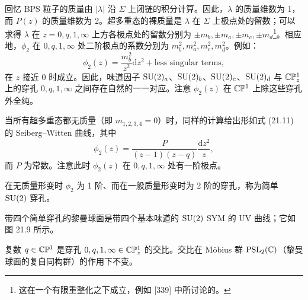 回忆 BPS 粒子的质量由 $|\lambda|$ 沿 $\Sigma$ 上闭链的积分计算。因此，$\lambda$ 的质量维数为 1，而 $P(z)$ 的质量维数为 2。超多重态的裸质量是 $\lambda$ 在 $\Sigma$ 上极点处的留数；可以求得 $\lambda$ 在 $z=0,q,1,\infty$ 上方各极点处的留数分别为 $\pm m_b,\pm m_a,\pm m_c,\pm m_d$\footnote{这在一个有限重整化之下成立，例如 [339] 中所讨论的。}。相应地，$\phi_2$ 在 $0,q,1,\infty$ 处二阶极点的系数分别为 $m_b^2,m_a^2,m_c^2,m_d^2$。例如：
\begin{equation}
\phi_2(z)=\frac{m_b^2}{z^2}\mathrm{d}z^2+\text{less singular terms},
\tag{21.12}
\end{equation}
在 $z$ 接近 0 时成立。因此，味道因子 $\operatorname{SU}(2)_a$、$\operatorname{SU}(2)_b$、$\operatorname{SU}(2)_c$、$\operatorname{SU}(2)_d$ 与 $\mathbb{C}\mathbb{P}^1_z$ 上的穿孔 $0,q,1,\infty$ 之间存在自然的一一对应。注意 $\phi_2(z)$ 在 $\mathbb{C}\mathbb{P}^1$ 上除这些穿孔外全纯。


\begin{remark}[21.16] 当所有超多重态都无质量（即 $m_{1,2,3,4}=0$）时，同样的计算给出形如式 (21.11) 的 Seiberg–Witten 曲线，其中
\[
\phi_2(z)=\frac{P}{(z-1)(z-q)}\frac{\mathrm{d}z^2}{z},
\]
而 $P$ 为常数。注意此时 $\phi_2(z)$ 在 $0,q,1,\infty$ 处有一阶极点。\end{remark}

\begin{definition}[21.17] 在无质量形变时 $\phi_2$ 为 1 阶、而在一般质量形变时为 2 阶的穿孔，称为简单 $\operatorname{SU}(2)$ 穿孔。\end{definition}

\begin{definition}[21.18] 带四个简单穿孔的黎曼球面是带四个基本味道的 $\operatorname{SU}(2)$ SYM 的 UV 曲线；它如图 21.9 所示。\end{definition}

\begin{remark}[21.19] 复数 $q\in\mathbb{C}\mathbb{P}^1$ 是穿孔 $0,q,1,\infty\in\mathbb{C}\mathbb{P}^1_z$ 的交比。交比在 Möbius 群 $\operatorname{PSL}_2(\mathbb{C})$（黎曼球面的复自同构群）的作用下不变。\end{remark}

